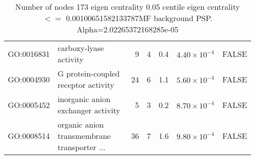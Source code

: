 \begin{table}[ht]
\begin{adjustbox}{max width=\textwidth}
\begin{tabular}{llrrrrl}
  GO:0016831 & carboxy-lyase activity & 9 & 4 & 0.4 & $4.40 \times 10^{-4}$ & FALSE \\ 
  GO:0004930 & G protein-coupled receptor activity & 24 & 6 & 1.1 & $5.60 \times 10^{-4}$ & FALSE \\ 
  GO:0005452 & inorganic anion exchanger activity & 5 & 3 & 0.2 & $8.70 \times 10^{-4}$ & FALSE \\ 
  GO:0008514 & organic anion transmembrane transporter ... & 36 & 7 & 1.6 & $9.80 \times 10^{-4}$ & FALSE \\ 
   \hline
\end{tabular}
\end{adjustbox}
\caption{Number of nodes 173 eigen centrality 0.05 centile  eigen centrality $<=$ 0.00100651582133787MF background PSP. Alpha=2.02265372168285e-05} 
\label{tab:Number of nodes 173 eigen centrality 0.05 centile  eigen centrality $<=$ 0.00100651582133787 MF background PSP. Alpha=2.02265372168285e-05}
\end{table}



